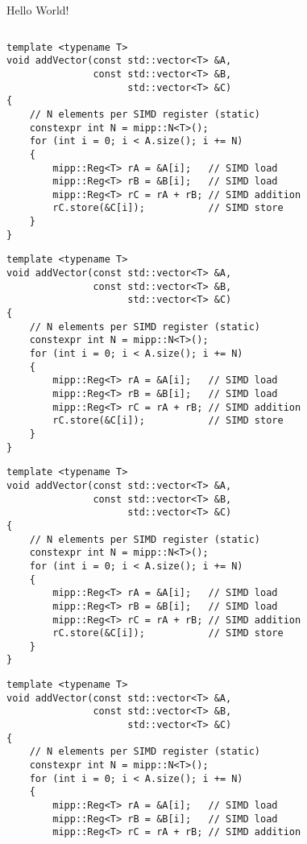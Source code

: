 \begin{frame}[fragile]{Hello World!}
  \vspace{-2mm}
  \begin{columns}[t]
    \begin{column}[T]{8.6cm}
      \begin{overprint}
      \begin{verbatim}
template <typename T>
void addVector(const std::vector<T> &A,
               const std::vector<T> &B,
                     std::vector<T> &C)
{
	// N elements per SIMD register (static)
	constexpr int N = mipp::N<T>();
	for (int i = 0; i < A.size(); i += N)
	{
		mipp::Reg<T> rA = &A[i];   // SIMD load
		mipp::Reg<T> rB = &B[i];   // SIMD load
		mipp::Reg<T> rC = rA + rB; // SIMD addition
		rC.store(&C[i]);           // SIMD store
	}
}
      \end{verbatim}
      \begin{verbatim}
template <typename T>
void addVector(const std::vector<T> &A,
               const std::vector<T> &B,
                     std::vector<T> &C)
{
	// N elements per SIMD register (static)
	constexpr int N = mipp::N<T>();
	for (int i = 0; i < A.size(); i += N)
	{
		mipp::Reg<T> rA = &A[i];   // SIMD load
		mipp::Reg<T> rB = &B[i];   // SIMD load
		mipp::Reg<T> rC = rA + rB; // SIMD addition
		rC.store(&C[i]);           // SIMD store
	}
}
      \end{verbatim}
      \begin{verbatim}
template <typename T>
void addVector(const std::vector<T> &A,
               const std::vector<T> &B,
                     std::vector<T> &C)
{
	// N elements per SIMD register (static)
	constexpr int N = mipp::N<T>();
	for (int i = 0; i < A.size(); i += N)
	{
		mipp::Reg<T> rA = &A[i];   // SIMD load
		mipp::Reg<T> rB = &B[i];   // SIMD load
		mipp::Reg<T> rC = rA + rB; // SIMD addition
		rC.store(&C[i]);           // SIMD store
	}
}
      \end{verbatim}
      \begin{verbatim}
template <typename T>
void addVector(const std::vector<T> &A,
               const std::vector<T> &B,
                     std::vector<T> &C)
{
	// N elements per SIMD register (static)
	constexpr int N = mipp::N<T>();
	for (int i = 0; i < A.size(); i += N)
	{
		mipp::Reg<T> rA = &A[i];   // SIMD load
		mipp::Reg<T> rB = &B[i];   // SIMD load
		mipp::Reg<T> rC = rA + rB; // SIMD addition

\end{verbatim}
\end{overprint}
\end{column}
\end{columns}
\end{frame}
